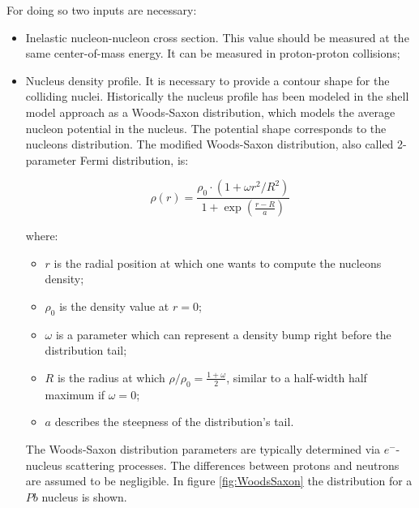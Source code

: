 For doing so two inputs are necessary:
\begin{itemize}
\item Inelastic nucleon-nucleon cross section. 
This value should be measured at the same center-of-mass energy. 
It can be measured in proton-proton collisions;
\item Nucleus density profile. It is necessary to provide a contour shape for the colliding nuclei. 
Historically the nucleus profile has been modeled in the shell model approach as a Woods-Saxon distribution, which models the average nucleon potential in the nucleus. 
The potential shape corresponds to the nucleons distribution.
The modified Woods-Saxon distribution, also called 2-parameter Fermi distribution, is:

\begin{equation}
\label{eq:WoodsSaxon}
\rho(r) = \frac{\rho_0\cdot(1+\omega r^2/R^2)}{1+\exp(\frac{r-R}{a})}
\end{equation}

where:
\begin{itemize}
\item $r$ is the radial position at which one wants to compute the nucleons density;
\item $\rho_0$ is the density value at $r=0$;
\item $\omega$ is a parameter which can represent a density bump right before the distribution tail;
\item $R$ is the radius at which $\rho/\rho_0=\frac{1+\omega}{2}$, similar to a half-width half maximum if $\omega=0$;
\item $a$ describes the steepness of the distribution's tail.
\end{itemize}
The Woods-Saxon distribution parameters are typically determined via $e^-$-nucleus scattering processes.
The differences between protons and neutrons are assumed to be negligible.
In figure \ref{fig:WoodsSaxon} the distribution for a $Pb$ nucleus is shown.

\end{itemize}

